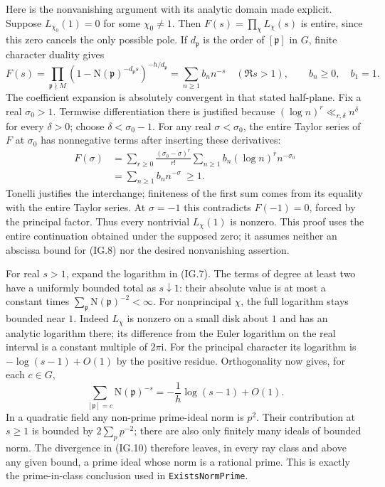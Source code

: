 Here is the nonvanishing argument with its analytic domain made
explicit. Suppose $L_{\chi_0}(1)=0$ for some $\chi_0\ne1$.
Then $F(s)=\prod_\chi L_\chi(s)$ is entire, since this zero
cancels the only possible pole. If $d_{\mathfrak p}$ is the order
of $[\mathfrak p]$ in $G$, finite character duality gives
\[
 F(s)=\prod_{\mathfrak p\nmid M}
    (1-\mathrm N(\mathfrak p)^{-d_{\mathfrak p}s})^{-h/d_{\mathfrak p}}
      =\sum_{n\ge1}b_n n^{-s}\quad(\Re s>1),
 \qquad b_n\ge0,\quad b_1=1.                          \tag{IG.8}
\]
The coefficient expansion is absolutely convergent in that stated
half-plane. Fix a real $\sigma_0>1$. Termwise differentiation there
is justified because $(\log n)^r\ll_{r,\delta}n^\delta$ for every
$\delta>0$; choose $\delta<\sigma_0-1$. For any real
$\sigma<\sigma_0$, the entire Taylor series of $F$ at $\sigma_0$
has nonnegative terms after inserting these derivatives:
\[
 \begin{split}
 F(\sigma)
 &=\sum_{r\ge0}\frac{(\sigma_0-\sigma)^r}{r!}
           \sum_{n\ge1}b_n(\log n)^r n^{-\sigma_0}\\
 &=\sum_{n\ge1}b_n n^{-\sigma}\ \geq1.               \tag{IG.9}
 \end{split}
\]
Tonelli justifies the interchange; finiteness of the first sum
comes from its equality with the entire Taylor series. At
$\sigma=-1$ this contradicts $F(-1)=0$, forced by the principal
factor. Thus every nontrivial $L_\chi(1)$ is nonzero. This proof
uses the entire continuation obtained under the supposed zero;
it assumes neither an abscissa bound for (IG.8) nor the desired
nonvanishing assertion.

For real $s>1$, expand the logarithm in (IG.7). The terms of
degree at least two have a uniformly bounded total as $s\downarrow1$:
their absolute value is at most a constant times
$\sum_{\mathfrak p}\mathrm N(\mathfrak p)^{-2}<\infty$.
For nonprincipal $\chi$, the full logarithm stays bounded near
$1$. Indeed $L_\chi$ is nonzero on a small disk about $1$ and
has an analytic logarithm there; its difference from the Euler
logarithm on the real interval is a constant multiple of
$2\pi\mathrm i$. For the principal character its logarithm is
$-\log(s-1)+O(1)$ by the positive residue. Orthogonality now gives,
for each $c\in G$,
\[
 \sum_{[\mathfrak p]=c}\mathrm N(\mathfrak p)^{-s}
                   =-\frac1h\log(s-1)+O(1).           \tag{IG.10}
\]
In a quadratic field any non-prime prime-ideal norm is $p^2$.
Their contribution at $s\ge1$ is bounded by
$2\sum_{p}p^{-2}$; there are also only finitely many ideals of
bounded norm. The divergence in (IG.10) therefore leaves, in
every ray class and above any given bound, a prime ideal whose
norm is a rational prime. This is exactly the prime-in-class
conclusion used in \texttt{ExistsNormPrime}.

